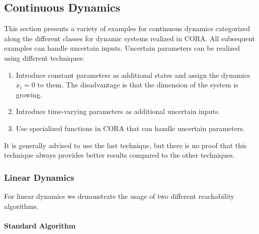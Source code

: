 \subsection{Continuous Dynamics}

This section presents a variety of examples for continuous dynamics categorized along the different classes for dynamic systems realized in CORA. All subsequent examples can handle uncertain inputs. Uncertain parameters can be realized using different techniques:
\begin{enumerate}
    \item Introduce constant parameters as additional states and assign the dynamics $\dot{x}_i = 0$ to them. The disadvantage is that the dimension of the system is growing.
    \item Introduce time-varying parameters as additional uncertain inputs.
    \item Use specialized functions in CORA that can handle uncertain parameters.
\end{enumerate}
It is generally advised to use the last technique, but there is no proof that this technique always provides better results compared to the other techniques.

\subsubsection{Linear Dynamics}

For linear dynamics we demonstrate the usage of two different reachability algorithms.

\paragraph{Standard Algorithm}

